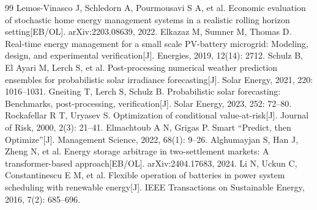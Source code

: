 \begin{thebibliography}{99}
 Lemos-Vinasco J, Schledorn A, Pourmousavi S A, et al. Economic evaluation of stochastic home energy management systems in a realistic rolling horizon setting[EB/OL]. arXiv:2203.08639, 2022.
 Elkazaz M, Sumner M, Thomas D. Real-time energy management for a small scale PV-battery microgrid: Modeling, design, and experimental verification[J]. Energies, 2019, 12(14): 2712.
 Schulz B, El Ayari M, Lerch S, et al. Post-processing numerical weather prediction ensembles for probabilistic solar irradiance forecasting[J]. Solar Energy, 2021, 220: 1016--1031.
 Gneiting T, Lerch S, Schulz B. Probabilistic solar forecasting: Benchmarks, post-processing, verification[J]. Solar Energy, 2023, 252: 72--80.
 Rockafellar R T, Uryasev S. Optimization of conditional value-at-risk[J]. Journal of Risk, 2000, 2(3): 21--41.
 Elmachtoub A N, Grigas P. Smart ``Predict, then Optimize''[J]. Management Science, 2022, 68(1): 9--26.
 Alghumayjan S, Han J, Zheng N, et al. Energy storage arbitrage in two-settlement markets: A transformer-based approach[EB/OL]. arXiv:2404.17683, 2024.
 Li N, Uckun C, Constantinescu E M, et al. Flexible operation of batteries in power system scheduling with renewable energy[J]. IEEE Transactions on Sustainable Energy, 2016, 7(2): 685--696.
\end{thebibliography}
